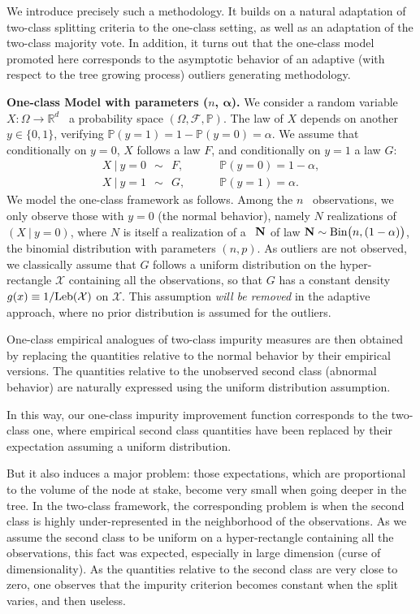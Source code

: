We introduce precisely such a methodology. It builds on a natural adaptation of two-class %
splitting criteria to the one-class setting, as well as an adaptation of the two-class majority vote.
In addition, it turns out that the one-class model promoted here corresponds to the asymptotic behavior of an adaptive (with respect to the tree growing process) outliers generating methodology.

\textbf{One-class Model with parameters ($n$, $\boldsymbol{\alpha}$).}
We consider a random variable $ X:\Omega \to \mathbb{R}^d$ \wrt~a probability space $(\Omega, \mathcal{F}, \mathbb{P})$.
The law of $X$ depends on another \rv~$y \in \{0,1\}$, verifying $\mathbb{P}(y=1)=1-\mathbb{P}(y=0)=\alpha$. We assume that conditionally on $y=0$, $ X$ follows a law $F$, and conditionally on $y=1$ a law $G$:
\begin{align*}
 X ~|~ y=0 ~~\sim~~ F, &~~~~~~~~~~  \mathbb{P}(y=0)=1-\alpha, \\
 X ~|~ y=1 ~~\sim~~ G, &~~~~~~~~~~  \mathbb{P}(y=1)=\alpha.
\end{align*}
%
We model the one-class framework as follows. Among the $n$ \iid~observations, we only observe those with $y=0$ (the normal behavior), namely $N$ realizations of $( X ~|~ y=0)$, where $N$ is itself a realization of a \rv~$\mathbf N$ of law $\mathbf N \sim \text{Bin}\big(n, (1-\alpha)\big)$, the binomial distribution with parameters $(n, p)$. As outliers are not observed, we classically assume that $G$ follows a uniform distribution on the hyper-rectangle $\mathcal{X}$ containing all the observations, so that $G$ has a constant density $g(x) \equiv 1 / \text{Leb}(\mathcal{X})$ on $\mathcal{X}$. This assumption \emph{will be removed} in the adaptive approach, where no prior distribution is assumed for the outliers.

One-class empirical analogues of two-class impurity measures are then obtained by replacing the quantities relative to the normal behavior by their empirical versions.
The quantities relative to the unobserved second class (abnormal behavior) are naturally expressed using the uniform distribution assumption.

In this way, our one-class impurity improvement function corresponds to the two-class one, where empirical second class quantities have been replaced by their expectation assuming a uniform distribution.

But it also induces a major problem: those expectations, which are proportional to the volume of the node at stake, become very small when going deeper in the tree. In the two-class framework, the corresponding problem is when the second class is highly under-represented in the neighborhood of the observations. 
%
As we assume the second class to be uniform on a hyper-rectangle containing all the observations, this fact was expected, especially in large dimension (curse of dimensionality). 
%
As the quantities relative to the second class are very close to zero, one observes that the impurity criterion becomes constant when the split varies, and then useless.

